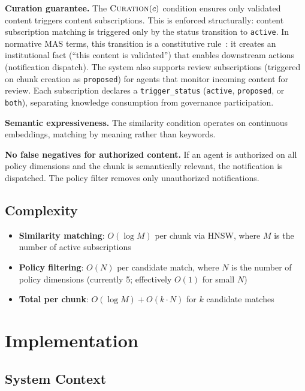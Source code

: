 \documentclass[11pt]{article}
\begin{document}
\textbf{Curation guarantee.} The $\textsc{Curation}(c)$ condition ensures only validated content triggers content subscriptions. This is enforced structurally: content subscription matching is triggered only by the status transition to \texttt{active}. In normative MAS terms, this transition is a constitutive rule~\cite{boella2004}: it creates an institutional fact (``this content is validated'') that enables downstream actions (notification dispatch). The system also supports review subscriptions (triggered on chunk creation as \texttt{proposed}) for agents that monitor incoming content for review. Each subscription declares a \texttt{trigger\_status} (\texttt{active}, \texttt{proposed}, or \texttt{both}), separating knowledge consumption from governance participation.

\textbf{Semantic expressiveness.} The similarity condition operates on continuous embeddings, matching by meaning rather than keywords.

\textbf{No false negatives for authorized content.} If an agent is authorized on all policy dimensions and the chunk is semantically relevant, the notification is dispatched. The policy filter removes only unauthorized notifications.

\subsection{Complexity}

\begin{itemize}[leftmargin=*]
\item \textbf{Similarity matching}: $O(\log M)$ per chunk via HNSW, where $M$ is the number of active subscriptions
\item \textbf{Policy filtering}: $O(N)$ per candidate match, where $N$ is the number of policy dimensions (currently 5; effectively $O(1)$ for small $N$)
\item \textbf{Total per chunk}: $O(\log M) + O(k \cdot N)$ for $k$ candidate matches
\end{itemize}

\section{Implementation}

\subsection{System Context}
\end{document}
